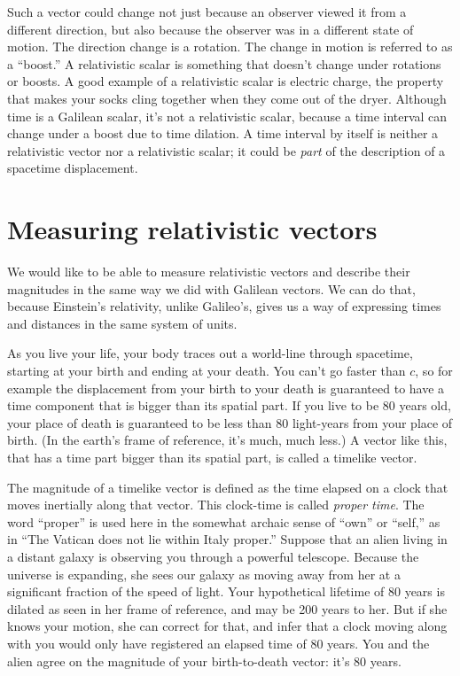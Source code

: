 Such a vector could change not just because an observer viewed it from a different direction, but also because
the observer was in a different state of motion. The direction change is a rotation. The change in motion is
referred to as a ``boost.'' A relativistic scalar is something that doesn't change under rotations or boosts.
A good example of a relativistic scalar is electric charge, the property that makes your socks cling together
when they come out of the dryer. Although time is a Galilean scalar, it's not a relativistic scalar, because
a time interval can change under a boost due to time dilation. A time interval by itself is neither a relativistic
vector nor a relativistic scalar; it could be \emph{part} of the description of a spacetime
displacement.

\section{Measuring relativistic vectors}

We would like to be able to measure relativistic vectors and describe their magnitudes in the same way
we did with Galilean vectors. We can do that, because Einstein's relativity, unlike Galileo's, gives us
a way of expressing times and distances in the same system of units.

As you live your life, your body traces out a world-line through spacetime, starting at your birth and ending at your death.
You can't go faster than $c$, so for example the displacement from your birth to your death is guaranteed to have
a time component that is bigger than its spatial part. If you live to be 80 years old, your place of
death is guaranteed to be less than 80 light-years from your place of birth. (In the earth's frame of reference,
it's much, much less.) A vector like this, that has a time part bigger than its spatial part, is called
a timelike vector.

The magnitude of a timelike vector is defined as the time elapsed on a clock that moves inertially along that
vector. This clock-time is called \emph{proper time}. The word ``proper'' is
used here in the somewhat archaic sense of ``own'' or ``self,'' as in ``The Vatican does not lie
within Italy proper.'' Suppose that an alien living in a distant galaxy is observing
you through a powerful telescope. Because the universe is expanding, she sees our galaxy as moving away from
her at a significant fraction of the speed of light. Your hypothetical lifetime of 80 years is dilated as seen
in her frame of reference, and may be 200 years to her. But if she knows your motion, she can correct for that,
and infer that a clock moving along with you would only have registered an elapsed time of 80 years. You and
the alien agree on the magnitude of your birth-to-death vector: it's 80 years.

